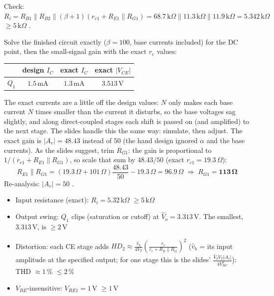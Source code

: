 \documentclass[11pt]{article}
\newcommand{\solstep}[2]{\par\medskip{\color{stepc}\textbf{Step #1 --- #2}}\par\nopagebreak}
\begin{document}
Check: $R_i = R_{B1}\|R_{B2}\|(\beta+1)(r_{e1} + R_{E1}\|R_{G1}) = 68.7\,\mathrm{k}\Omega\|11.3\,\mathrm{k}\Omega\|11.9\,\mathrm{k}\Omega = 5.342\,\mathrm{k}\Omega$ $\ge 5\,\mathrm{k}\Omega$ \checkmark.
\solstep{4}{Check by analysis}Solve the finished circuit exactly ($\beta=100$, base currents included) for the DC point, then the small-signal gain with the exact $r_e$ values:\begin{center}\renewcommand{\arraystretch}{1.35}
\begin{tabular}{cccc}
\toprule
 & design $I_C$ & exact $I_C$ & exact $|V_{CE}|$ \\
\midrule
$Q_{1}$ & $1.5\,\mathrm{m}\mathrm{A}$ & $1.3\,\mathrm{m}\mathrm{A}$ & $3.513\,\mathrm{V}$ \\
\bottomrule
\end{tabular}\end{center}
The exact currents are a little off the design values: $N$ only makes each base current $N$ times smaller than the current it disturbs, so the base voltages sag slightly, and along direct-coupled stages each shift is passed on (and amplified) to the next stage. The slides handle this the same way: simulate, then adjust. The exact gain is $|A_v| = 48.43$ instead of $50$ (the hand design ignored $\alpha$ and the base currents). As the slides suggest, trim $R_{G1}$: the gain is proportional to $1/(r_{e1} + R_{E1}\|R_{G1})$, so scale that sum by $48.43/50$ (exact $r_{e1} = 19.3\,\Omega$):\[R_{E1}\|R_{G1} = (19.3\,\Omega + 101\,\Omega)\frac{48.43}{50} - 19.3\,\Omega = 96.9\,\Omega \;\Rightarrow\; R_{G1} = \mathbf{113\,\Omega}\]Re-analysis: $|A_v| = 50$ \checkmark. \begin{itemize}[leftmargin=*,itemsep=2pt]
\item Input resistance (exact): $R_i = 5.32\,\mathrm{k}\Omega$ $\ge 5\,\mathrm{k}\Omega$ \checkmark
\item Output swing: $Q_{1}$ clips (saturation or cutoff) at $\hat V_o = 3.313\,\mathrm{V}$. The smallest, $3.313\,\mathrm{V}$, is $\ge 2$\,V \checkmark
\item Distortion: each CE stage adds $HD_2 \approx \frac{\hat v_b}{4V_T}\left(\frac{r_e}{r_e + R_E\|R_G}\right)^2$ ($\hat v_b$ = its input amplitude at the specified output; for one stage this is the slides' $\frac{\hat V_o V_T |A_v|}{4V_{RC}^2}$): THD $\approx 1\,\%$ $\le 2\,\%$ \checkmark
\item $V_{BE}$-insensitive: $V_{RE1} = 1$\,V $\ge 1$\,V \checkmark
\end{itemize}
\end{document}
